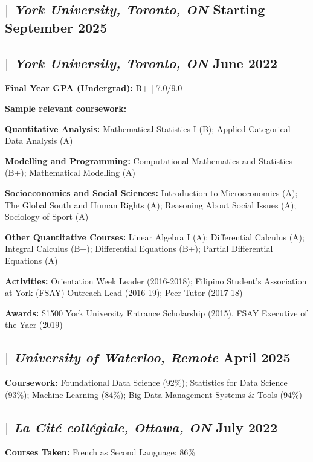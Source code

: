 
\subsection{ | \textit{York University, Toronto, ON}	\hfill Starting September 2025}
\subsection{ | \textit{York University, Toronto, ON} \hfill	June 2022}
\begin{zitemize}
\item \textbf{Final Year GPA (Undergrad):} B+ | 7.0/9.0
\item \textbf{Sample relevant coursework:}
\begin{zitemize}
\item \textbf{Quantitative Analysis:} Mathematical Statistics I (B); Applied Categorical Data Analysis (A)
\item \textbf{Modelling and Programming:} Computational Mathematics and Statistics (B+); Mathematical Modelling (A)
\item \textbf{Socioeconomics and Social Sciences:} Introduction to Microeconomics (A); The Global South and Human Rights (A); Reasoning About Social Issues (A); Sociology of Sport (A)  
\item \textbf{Other Quantitative Courses:} Linear Algebra I (A); Differential Calculus (A); Integral Calculus (B+); Differential Equations (B+); Partial Differential Equations (A)
\end{zitemize}
\item \textbf{Activities:} Orientation Week Leader (2016-2018); Filipino Student’s Association at York (FSAY) Outreach Lead (2016-19); Peer Tutor (2017-18)
\item \textbf{Awards:}  \$1500 York University Entrance Scholarship (2015), FSAY Executive of the Yaer (2019)
\end{zitemize}

\subsection{ | \textit{University of Waterloo, Remote} \hfill	April 2025}
\begin{zitemize}
\item \textbf{Coursework:}  Foundational Data Science (92\%); Statistics for Data Science (93\%); Machine Learning (84\%); Big Data Management Systems \& Tools (94\%)
\end{zitemize}

\subsection{ | \textit{La Cité collégiale, Ottawa, ON} \hfill	July 2022}
\begin{zitemize}
\item \textbf{Courses Taken:} French as Second Language: 86\%
\end{zitemize}



